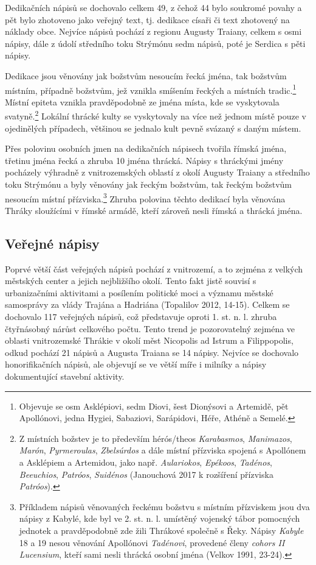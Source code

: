 Dedikačních nápisů se dochovalo celkem 49, z čehož 44 bylo soukromé povahy a pět bylo zhotoveno jako veřejný text, tj. dedikace císaři či text zhotovený na náklady obce. Nejvíce nápisů pochází z regionu Augusty Traiany, celkem s osmi nápisy, dále z údolí středního toku Strýmónu sedm nápisů, poté je Serdica s pěti nápisy.

Dedikace jsou věnovány jak božstvům nesoucím řecká jména, tak božstvům místním, případně božstvům, jež vznikla smíšením řeckých a místních tradic.\footnote{Objevuje se osm Asklépiovi, sedm Diovi, šest Dionýsovi a Artemidě, pět Apollónovi, jedna Hygiei, Sabaziovi, Sarápidovi, Héře, Athéně a Semelé.} Místní epiteta vznikla pravděpodobně ze jména místa, kde se vyskytovala svatyně.\footnote{Z místních božstev je to především hérós/theos {\em Karabasmos}, {\em Manimazos}, {\em Marón}, {\em Pyrmeroulas}, {\em Zbelsúrdos} a dále místní přízviska spojená s Apollónem a Asklépiem a Artemidou, jako např. {\em Aulariokos}, {\em Epékoos}, {\em Tadénos}, {\em Beeuchios}, {\em Patróos}, {\em Suidénos} (Janouchová 2017 k rozšíření přízviska {\em Patróos}).} Lokální thrácké kulty se vyskytovaly na více než jednom místě pouze v ojedinělých případech, většinou se jednalo kult pevně svázaný s daným místem.

Přes polovinu osobních jmen na dedikačních nápisech tvořila římská jména, třetinu jména řecká a zhruba 10  jména thrácká. Nápisy s thráckými jmény pocházely výhradně z vnitrozemských oblastí z okolí Augusty Traiany a středního toku Strýmónu a byly věnovány jak řeckým božstvům, tak řeckým božstvům nesoucím místní přízviska.\footnote{Příkladem nápisů věnovaných řeckému božstvu s místním přízviskem jsou dva nápisy z Kabylé, kde byl ve 2. st. n. l. umístěný vojenský tábor pomocných jednotek a pravděpodobně zde žili Thrákové společně s Řeky. Nápisy {\em Kabyle} 18 a 19 nesou věnování Apollónovi {\em Tadénovi}, provedené členy {\em cohors II Lucensium}, kteří sami nesli thrácká osobní jména (Velkov 1991, 23-24).} Zhruba polovina těchto dedikací byla věnována Thráky sloužícími v římské armádě, kteří zároveň nesli římská a thrácká jména.

\subsection[veřejné-nápisy-13]{Veřejné nápisy}

Poprvé větší část veřejných nápisů pochází z vnitrozemí, a to zejména z velkých městských center a jejich nejbližšího okolí. Tento fakt jistě souvisí s urbanizačními aktivitami a posílením politické moci a významu městské samosprávy za vlády Trajána a Hadriána (Topalilov 2012, 14-15). Celkem se dochovalo 117 veřejných nápisů, což představuje oproti 1. st. n. l. zhruba čtyřnásobný nárůst celkového počtu. Tento trend je pozorovatelný zejména ve oblasti vnitrozemské Thrákie v okolí měst Nicopolis ad Istrum a Filippopolis, odkud pochází 21 nápisů a Augusta Traiana se 14 nápisy. Nejvíce se dochovalo honorifikačních nápisů, ale objevují se ve větší míře i milníky a nápisy dokumentující stavební aktivity.

